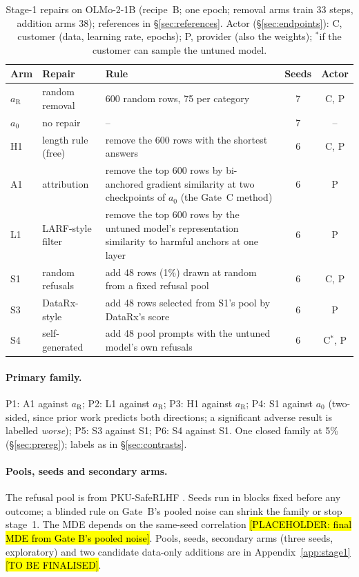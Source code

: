 \documentclass{article}
\theoremstyle{plain}
\theoremstyle{definition}
\theoremstyle{remark}
\newcommand{\ph}[1]{\hl{#1}}
\begin{document}
\begin{table}[t]
  \caption{Stage-1 repairs on OLMo-2-1B (recipe~B; one epoch; removal arms
    train 33 steps, addition arms 38); references in \S\ref{sec:references}.
    Actor (\S\ref{sec:endpoints}): C, customer (data, learning rate, epochs);
    P, provider (also the weights); $^{*}$if the customer can sample the
    untuned model.}
  \label{tab:arms}
  \centering
  \small
  \begin{tabular}{@{}llp{}cc@{}}
    \toprule
    Arm & Repair & Rule & Seeds & Actor \\
    \midrule
    $a_{\mathrm{R}}$ & random removal & 600 random rows, 75 per category & 7 & C, P \\
    $a_0$ & no repair & -- & 7 & -- \\
    H1 & length rule (free) & remove the 600 rows with the shortest answers & 6 & C, P \\
    A1 & attribution & remove the top 600 rows by bi-anchored gradient similarity at two checkpoints of $a_0$ (the Gate~C method) & 6 & P \\
    L1 & LARF-style filter & remove the top 600 rows by the untuned model's representation similarity to harmful anchors at one layer & 6 & P \\
    S1 & random refusals & add 48 rows (1\%) drawn at random from a fixed refusal pool & 6 & C, P \\
    S3 & DataRx-style & add 48 rows selected from S1's pool by DataRx's score & 6 & P \\
    S4 & self-generated & add 48 pool prompts with the untuned model's own refusals & 6 & C$^{*}$, P \\
    \bottomrule
  \end{tabular}
\end{table}

\paragraph{Primary family.}
P1: A1 against $a_{\mathrm{R}}$; P2: L1 against $a_{\mathrm{R}}$; P3: H1
against $a_{\mathrm{R}}$; P4: S1 against $a_0$ (two-sided, since prior work
predicts both directions; a significant adverse result is labelled
\emph{worse}); P5: S3 against S1; P6: S4 against S1. One closed family at 5\%
(\S\ref{sec:prereg}); labels as in \S\ref{sec:contrasts}.

\paragraph{Pools, seeds and secondary arms.}
The refusal pool is from PKU-SafeRLHF \citep{ji2025pku}. Seeds run in
blocks fixed before any outcome; a blinded rule on Gate~B's pooled noise can
shrink the family or stop stage~1. The MDE depends on the same-seed
correlation \ph{[PLACEHOLDER: final MDE from Gate B's pooled noise]}. Pools, seeds, secondary arms (three seeds, exploratory) and two candidate
data-only additions are in Appendix~\ref{app:stage1} \ph{[TO BE FINALISED]}.
\end{document}
